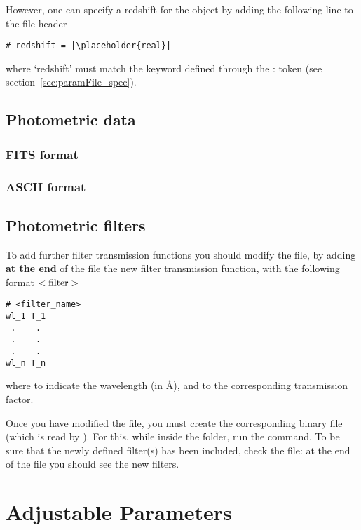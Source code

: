 \documentclass[a4paper,11pt,twoside]{article}
\begin{document}
However, one can specify a redshift for the object by adding the following line to the file header

\begin{verbatim}
# redshift = |\placeholder{real}|
\end{verbatim}

where `redshift' must match the keyword defined through the : token (see section~\ref{sec:paramFile_spec}). 

\subsection{Photometric data}

\subsubsection{FITS format}

\subsubsection{ASCII format}


\subsection{Photometric filters}


To add further filter transmission functions you should modify the \cmd{\$} file, by adding {\bf at the end} of the file the new filter transmission function, with the following format 
$<\textnormal{filter}>$
\begin{verbatim}
# <filter_name>
wl_1 T_1
 .    .
 .    .
 .    .
wl_n T_n
\end{verbatim}
where  to  indicate the wavelength (in \AA), and  to  the corresponding transmission factor. 

Once you have modified the  file, you must create the corresponding  binary file (which is read by \beagle). For this, while inside the  folder, run the  command. To be sure that the newly defined filter(s) has been included, check the  file: at the end of the file you should see the new filters.

\clearpage
\section{Adjustable Parameters}
\end{document}

